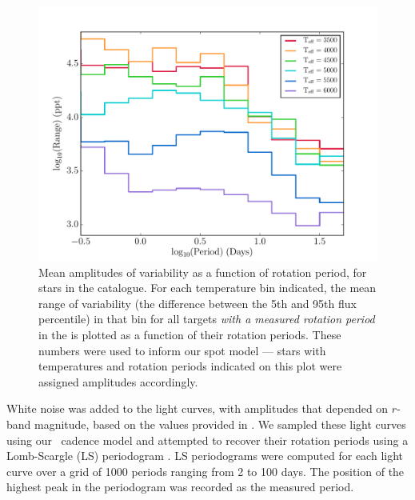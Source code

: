 \begin{figure}
\begin{center}
\includegraphics[width=6in, clip=true]{figures/amp_hist.pdf}
\caption[The mean amplitudes of variability for stars in the
\citet{Mcquillan2014} catalogue, according to their temperatures.]
{Mean amplitudes of variability as a function of rotation period, for stars
in the \citet{Mcquillan2014} catalogue.
For each temperature bin indicated, the mean range of variability (the
difference between the 5th and 95th flux percentile) in that bin for all
targets {\it with a measured rotation period} in the \citet{Mcquillan2014} is
plotted as a function of their rotation periods.
These numbers were used to inform our spot model --- stars with temperatures
and rotation periods indicated on this plot were assigned amplitudes
accordingly.
}
\label{fig:amp_hist}
\end{center}
\end{figure}

White noise was added to the light curves, with amplitudes that depended on
$r$-band magnitude, based on the values provided in \citet{Jacklin2015}.
We sampled these light curves using our \LSST\ cadence model and attempted to
recover their rotation periods using a Lomb-Scargle (LS) periodogram
\citep[][]{Lomb1976, Scargle1982}.
LS periodograms were computed for each light curve over a grid of 1000 periods
ranging from 2 to 100 days.
The position of the highest peak in the periodogram was recorded as the
measured period.

